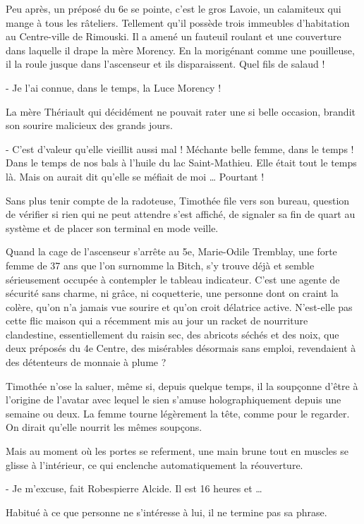 Peu après, un préposé du 6e se pointe, c’est le gros Lavoie, un calamiteux qui mange à tous les râteliers. Tellement qu’il possède trois immeubles d’habitation au Centre-ville de Rimouski. Il a amené un fauteuil roulant et une couverture dans laquelle il drape la mère Morency. En la morigénant comme une pouilleuse, il la roule jusque dans l’ascenseur et ils disparaissent. Quel fils de salaud !

- Je l’ai connue, dans le temps, la Luce Morency !

La mère Thériault qui décidément ne pouvait rater une si belle occasion, brandit son sourire malicieux des grands jours.

- C’est d’valeur qu’elle vieillit aussi mal ! Méchante belle femme, dans le temps ! Dans le temps de nos bals à l’huile du lac Saint-Mathieu. Elle était tout le temps là. Mais on aurait dit qu’elle se méfiait de moi … Pourtant !

Sans plus tenir compte de la radoteuse, Timothée file vers son bureau, question de vérifier si rien qui ne peut attendre s’est affiché, de signaler sa fin de quart au système et de placer son terminal en mode veille.

Quand la cage de l’ascenseur s’arrête au 5e, Marie-Odile Tremblay, une forte femme de 37 ans que l’on surnomme la Bitch, s’y trouve déjà et semble sérieusement occupée à contempler le tableau indicateur. C’est une agente de sécurité sans charme, ni grâce, ni coquetterie, une personne dont on craint la colère, qu’on n’a jamais vue sourire et qu’on croit délatrice active. N’est-elle pas cette flic maison qui a récemment mis au jour un racket de nourriture clandestine, essentiellement du raisin sec, des abricots séchés et des noix, que deux préposés du 4e Centre, des misérables désormais sans emploi, revendaient à des détenteurs de monnaie à plume ?

Timothée n’ose la saluer, même si, depuis quelque temps, il la soupçonne d’être à l’origine de l’avatar avec lequel le sien s’amuse holographiquement depuis une semaine ou deux. La femme tourne légèrement la tête, comme pour le regarder. On dirait qu’elle nourrit les mêmes soupçons.

Mais au moment où les portes se referment, une main brune tout en muscles se glisse à l’intérieur, ce qui enclenche automatiquement la réouverture.

- Je m’excuse, fait Robespierre Alcide. Il est 16 heures et …

Habitué à ce que personne ne s’intéresse à lui, il ne termine pas sa phrase.

